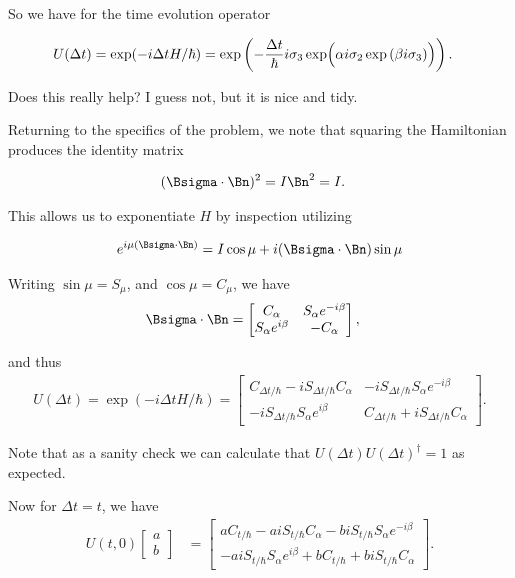 So we have for the time evolution operator

\begin{align}\label{eqn:desaiCh5:610}
U(\Delta t) 
&=
\exp( -i \Delta t H /\hbar )
= 
\exp \left(
- \frac{\Delta t}{\hbar} i \sigma_3 \exp\Bigl( \alpha i \sigma_2 
\exp\left( \beta i \sigma_3 
\right)
\Bigr)
\right).
\end{align}

Does this really help?  I guess not, but it is nice and tidy.

Returning to the specifics of the problem, we note that squaring the Hamiltonian produces the identity matrix

\begin{align}\label{eqn:desaiCh5:615}
(\Bsigma \cdot \Bn)^2 &= I \Bn^2 = I.
\end{align}

This allows us to exponentiate $H$ by inspection utilizing

\begin{align}\label{eqn:desaiCh5:620}
e^{i \mu (\Bsigma \cdot \Bn) } = I \cos\mu + i (\Bsigma \cdot \Bn) \sin\mu
\end{align}

Writing $\sin\mu = S_\mu$, and $\cos\mu = C_\mu$, we have
\begin{align}\label{eqn:desaiCh5:625}
\Bsigma \cdot \Bn &=
\begin{bmatrix}
C_\alpha & S_\alpha e^{-i\beta} \\
S_\alpha e^{i\beta} & -C_\alpha
\end{bmatrix},
\end{align}

and thus
\begin{align}\label{eqn:desaiCh5:630}
U(\Delta t) = \exp( -i \Delta t H /\hbar )
=
\begin{bmatrix}
C_{\Delta t/\hbar} -i S_{\Delta t/\hbar} C_\alpha & -i S_{\Delta t/\hbar} S_\alpha e^{-i\beta} \\
-i S_{\Delta t/\hbar} S_\alpha e^{i\beta} & C_{\Delta t/\hbar} + i S_{\Delta t/\hbar} C_\alpha
\end{bmatrix}.
\end{align}

Note that as a sanity check we can calculate that $ U(\Delta t) U(\Delta t)^\dagger = 1$ as expected.

Now for $\Delta t = t$, we have 
\begin{align}\label{eqn:desaiCh5:640}
U(t,0) 
\begin{bmatrix}
a \\
b
\end{bmatrix}
&=
\begin{bmatrix}
a C_{t/\hbar} -a i S_{t/\hbar} C_\alpha  - b i S_{t/\hbar} S_\alpha e^{-i\beta} \\
-a i S_{t/\hbar} S_\alpha e^{i\beta} + b C_{t/\hbar} + b i S_{t/\hbar} C_\alpha
\end{bmatrix}.
\end{align}

